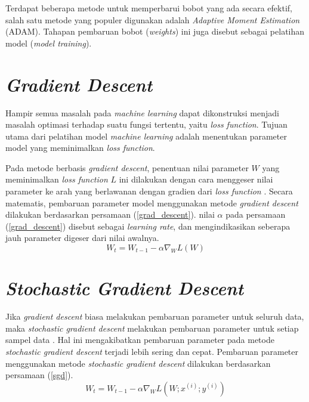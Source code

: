 \documentclass[a4paper,12pt]{report}
\begin{document}
Terdapat beberapa metode untuk memperbarui bobot yang ada secara efektif, salah satu metode yang populer digunakan adalah \textit{Adaptive Moment Estimation} (ADAM). Tahapan pembaruan bobot (\textit{weights}) ini juga disebut sebagai pelatihan model (\textit{model training}).

\section{\textit{Gradient Descent}}
Hampir semua masalah pada \textit{machine learning} dapat dikonstruksi menjadi masalah optimasi terhadap suatu fungsi tertentu, yaitu \textit{loss function}. Tujuan utama dari pelatihan model \textit{machine learning} adalah menentukan parameter model yang meminimalkan \textit{loss function}. 

Pada metode berbasis \textit{gradient descent}, penentuan nilai parameter $W$ yang meminimalkan \textit{loss function} $L$ ini dilakukan dengan cara menggeser nilai parameter ke arah yang berlawanan dengan gradien dari \textit{loss function} \cite{aggarwalNeuralNetworksDeep2018}. Secara matematis, pembaruan parameter model menggunakan metode \textit{gradient descent} dilakukan berdasarkan persamaan (\ref{grad_descent}). nilai $\alpha$ pada persamaan (\ref{grad_descent}) disebut sebagai \textit{learning rate}, dan mengindikasikan seberapa jauh parameter digeser dari nilai awalnya.
\begin{equation}
	W_t = W_{t-1} - \alpha\nabla_WL(W)
	\label{grad_descent}
\end{equation}

\section{\textit{Stochastic Gradient Descent}}
Jika \textit{gradient descent} biasa melakukan pembaruan parameter untuk seluruh data, maka \textit{stochastic gradient descent} melakukan pembaruan parameter untuk setiap sampel data \cite{ruderOverviewGradientDescent2017}. Hal ini mengakibatkan pembaruan parameter pada metode \textit{stochastic gradient descent} terjadi lebih sering dan cepat. Pembaruan parameter menggunakan metode \textit{stochastic gradient descent} dilakukan berdasarkan persamaan (\ref{sgd}).
\begin{equation}
	W_t = W_{t-1} - \alpha\nabla_WL(W; x^{(i)}; y^{(i)})
	\label{sgd}
\end{equation}
\end{document}
